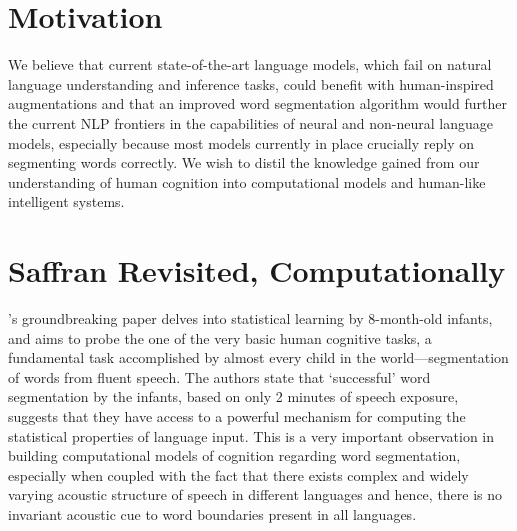 \documentclass{article}
\begin{document}
\section{Motivation}
We believe that
current state-of-the-art language models, which fail on natural language understanding and inference tasks, could benefit with human-inspired augmentations and that an improved word segmentation algorithm would further the current NLP frontiers in the capabilities of neural and non-neural language models, especially because most models currently in place crucially reply on segmenting words correctly. We wish to distil the knowledge gained from our understanding of human cognition into computational models and human-like intelligent systems.




\section{Saffran Revisited, Computationally}
\citet{Saffran1996}'s groundbreaking paper delves into statistical learning by 8-month-old infants, and aims to probe the one of the very basic human cognitive tasks, a fundamental task accomplished by almost every child in the world---segmentation of words from fluent speech. The authors state that `successful' word segmentation by the infants, based on only 2 minutes of speech exposure, suggests that they have access to a powerful mechanism for computing the statistical properties of language input. This is a very important observation in building computational models of cognition regarding word segmentation, especially when coupled with the fact that there exists complex and widely varying acoustic structure of speech in different languages and hence, there is no invariant acoustic cue to word boundaries present in all languages.
\end{document}
